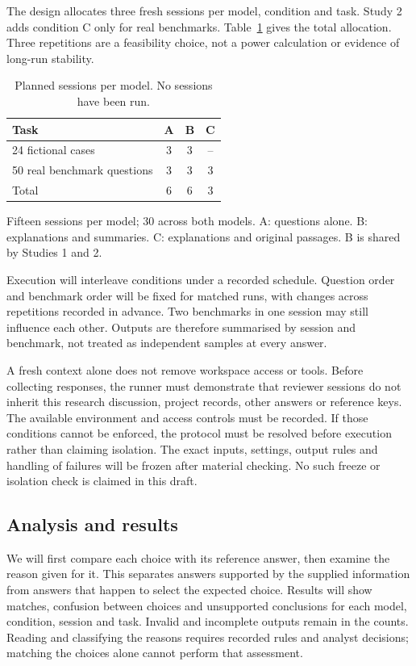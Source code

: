 \documentclass[10pt,conference]{IEEEtran}
\begin{document}
The design allocates three fresh sessions per model, condition and task. Study 2 adds condition C only for real benchmarks. Table~\ref{tab:sessions} gives the total allocation. Three repetitions are a feasibility choice, not a power calculation or evidence of long-run stability.

\begin{table}[t]
\caption{Planned sessions per model. No sessions have been run.}
\label{tab:sessions}
\small
\begin{tabularx}{\columnwidth}{@{}Xccc@{}}
\toprule
Task & A & B & C \\
\midrule
24 fictional cases & 3 & 3 & -- \\
50 real benchmark questions & 3 & 3 & 3 \\
\midrule
Total & 6 & 6 & 3 \\
\bottomrule
\end{tabularx}
\par\smallskip
{\footnotesize Fifteen sessions per model; 30 across both models. A: questions alone. B: explanations and summaries. C: explanations and original passages. B is shared by Studies 1 and 2.}
\end{table}

Execution will interleave conditions under a recorded schedule. Question order and benchmark order will be fixed for matched runs, with changes across repetitions recorded in advance. Two benchmarks in one session may still influence each other. Outputs are therefore summarised by session and benchmark, not treated as independent samples at every answer.

A fresh context alone does not remove workspace access or tools. Before collecting responses, the runner must demonstrate that reviewer sessions do not inherit this research discussion, project records, other answers or reference keys. The available environment and access controls must be recorded. If those conditions cannot be enforced, the protocol must be resolved before execution rather than claiming isolation. The exact inputs, settings, output rules and handling of failures will be frozen after material checking. No such freeze or isolation check is claimed in this draft.

\subsection{Analysis and results}
We will first compare each choice with its reference answer, then examine the reason given for it. This separates answers supported by the supplied information from answers that happen to select the expected choice. Results will show matches, confusion between choices and unsupported conclusions for each model, condition, session and task. Invalid and incomplete outputs remain in the counts. Reading and classifying the reasons requires recorded rules and analyst decisions; matching the choices alone cannot perform that assessment.
\end{document}
